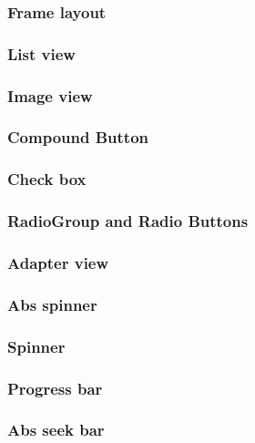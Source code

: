 \documentclass{report}
\begin{document}
    \pagebreak 
    \subsubsection{Frame layout}

    \pagebreak 
    \subsubsection{List view}

    \pagebreak 
    \subsubsection{Image view}

    \pagebreak 
    \subsubsection{Compound Button}

    \pagebreak 
    \subsubsection{Check box}

    \pagebreak 
    \subsubsection{RadioGroup and Radio Buttons}

    \pagebreak 
    \subsubsection{Adapter view}

    \pagebreak 
    \subsubsection{Abs spinner}

    \pagebreak 
    \subsubsection{Spinner}

    \pagebreak 
    \subsubsection{Progress bar}

    \pagebreak 
    \subsubsection{Abs seek bar}
\end{document}
